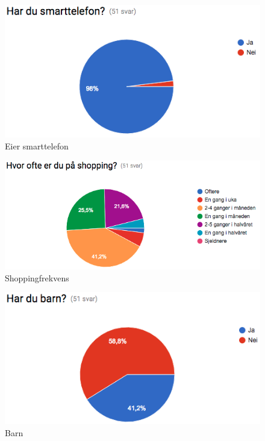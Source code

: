 \begin{figure}[H]
\includegraphics[scale=0.6]{images/sporreundersokelse/smarttelefon}
\centering %
\caption{Eier smarttelefon}
\label{fig:smarttelefon}
\end{figure}

\begin{figure}[H]
\includegraphics[scale=0.6]{images/sporreundersokelse/shopping}
\centering %
\caption{Shoppingfrekvens}
\label{fig:shopping}
\end{figure}

\begin{figure}[H]
\includegraphics[scale=0.6]{images/sporreundersokelse/barn}
\centering %
\caption{Barn}
\label{fig:barn}
\end{figure}

